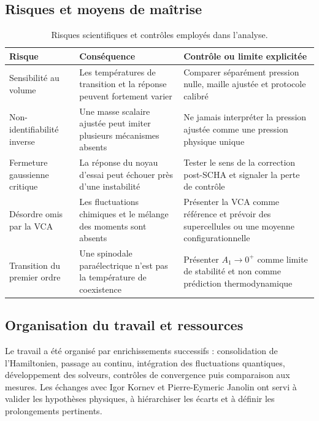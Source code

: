 \documentclass{rapportCS}
\begin{document}
\subsection{Risques et moyens de maîtrise}

\begin{table}[H]
\centering
\caption{Risques scientifiques et contrôles employés dans l'analyse.}
\label{tab:cs_risk_register}
\begingroup
\footnotesize
\setlength{\tabcolsep}{4pt}
\renewcommand{\arraystretch}{0.98}
\begin{tabular}{p{}p{}p{}}
\hline
Risque & Conséquence & Contrôle ou limite explicitée \\
\hline
Sensibilité au volume & Les températures de transition et la réponse peuvent fortement varier & Comparer séparément pression nulle, maille ajustée et protocole calibré \\
Non-identifiabilité inverse & Une masse scalaire ajustée peut imiter plusieurs mécanismes absents & Ne jamais interpréter la pression ajustée comme une pression physique unique \\
Fermeture gaussienne critique & La réponse du noyau d'essai peut échouer près d'une instabilité & Tester le sens de la correction post-SCHA et signaler la perte de contrôle \\
Désordre omis par la VCA & Les fluctuations chimiques et le mélange des moments sont absents & Présenter la VCA comme référence et prévoir des supercellules ou une moyenne configurationnelle \\
Transition du premier ordre & Une spinodale\footnotemark{} paraélectrique n'est pas la température de coexistence & Présenter $A_1\to0^+$ comme limite de stabilité et non comme prédiction thermodynamique \\
\hline
\end{tabular}
\endgroup
\end{table}

\subsection{Organisation du travail et ressources}

Le travail a été organisé par enrichissements successifs : consolidation de
l'Hamiltonien, passage au continu, intégration des fluctuations quantiques,
développement des solveurs, contrôles de convergence puis comparaison aux
mesures. Les échanges avec Igor Kornev et Pierre-Eymeric Janolin ont servi à
valider les hypothèses physiques, à hiérarchiser les écarts et à définir les
prolongements pertinents.
\end{document}
